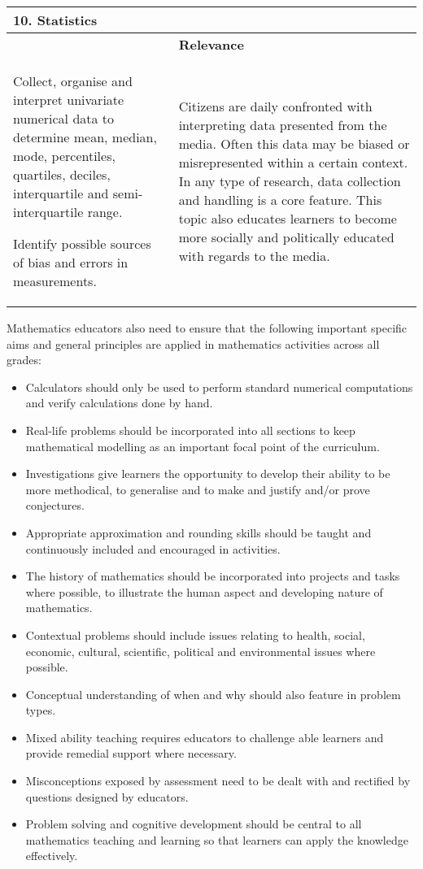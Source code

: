 \begin{table}[H]
 \begin{center} 
\begin{tabular}{|p{8.5cm}|p{3.5cm}|} \hline
\textbf{10. Statistics}& \\ \hline  
& \textbf{Relevance} \\ \hline
Collect, organise and interpret univariate numerical data to determine mean, median, mode, percentiles, quartiles, deciles, interquartile and semi-interquartile range.\par
Identify possible sources of bias and errors in measurements.
& Citizens are daily confronted with interpreting data presented from the media. Often this data may be biased or misrepresented within a certain context. In any type of research, data collection and handling is a core feature. This topic also educates learners to become more socially and politically educated with regards to the media.
\\ \hline

 \end{tabular}
\end{center}
\end{table}

Mathematics educators also need to ensure that the following important specific aims and general principles are applied in mathematics activities across all grades:
\begin{itemize}[noitemsep]
\item Calculators should only be used to perform standard numerical computations and verify calculations done by hand.
\item Real-life problems should be incorporated into all sections to keep mathematical modelling as an important focal point of the curriculum.
\item Investigations give learners the opportunity to develop their ability to be more methodical, to generalise and to make and justify and/or prove conjectures.
\item Appropriate approximation and rounding skills should be taught and continuously included and encouraged in activities.
\item The history of mathematics should be incorporated into projects and tasks where possible, to illustrate the human aspect and developing nature of mathematics. 
\item Contextual problems should include issues relating to health, social, economic, cultural, scientific, political and environmental issues where possible. 
\item Conceptual understanding of when and why should also feature in problem types.
\item Mixed ability teaching requires educators to challenge able learners and provide remedial support where necessary. 
\item Misconceptions exposed by assessment need to be dealt with and rectified by questions designed by educators. 
\item Problem solving and cognitive development should be central to all mathematics teaching and learning so that learners can apply the knowledge effectively. 
\end{itemize}

